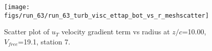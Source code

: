 \begin{figure}[H]
\centering
\texttt{[image: figs/run\_63/run\_63\_turb\_visc\_ettap\_bot\_vs\_r\_meshscatter]}
\caption{Scatter plot of $
u_T$ velocity gradient term vs radius at $z/c$=10.00, $V_{free}$=19.1, station 7.}
\end{figure}


